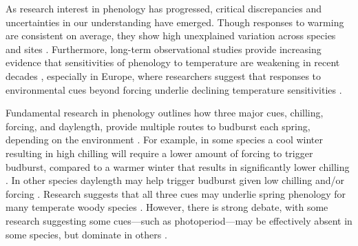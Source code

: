 \documentclass{article}
\begin{document}
\par As research interest in phenology has progressed, critical discrepancies and uncertainties in our understanding have emerged. Though responses to warming are consistent on average, they show high unexplained variation across species and sites \citep{Wolkovich:2012n}. Furthermore, long-term observational studies provide increasing evidence that sensitivities of phenology to temperature are weakening in recent decades \cite{Rutishauser:2008,yu2010}, especially in Europe, where researchers suggest that responses to environmental cues beyond forcing underlie declining temperature sensitivities  \cite{fu2015}.

\par Fundamental research in phenology outlines how three major cues,  chilling, forcing, and daylength, provide multiple routes to budburst each spring, depending on the environment \citep{chuineJTB}. For example, in some species a cool winter resulting in high chilling will require a lower amount of forcing to trigger budburst, compared to a warmer winter that results in significantly lower chilling \citep{harrington2015}. In other species daylength may help trigger budburst given low chilling and/or forcing \citep{Basler:2014aa, Caffarra:2011b, zohner2016}. Research suggests that all three cues may underlie spring phenology for many temperate woody species \citep{flynn2018,Basler:2014aa,Caffarra:2011qf}. However, there is strong debate, with some research suggesting some cues---such as photoperiod---may be effectively absent in some species, but dominate in others \citep{zohner2016,koerner2010a}. 
\end{document}
